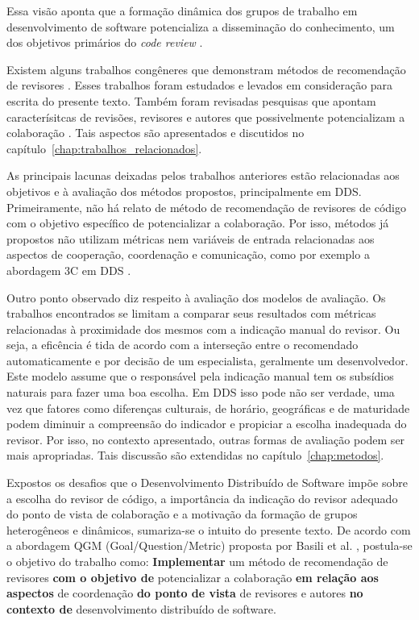 \documentclass[12pt,openany,oneside,a4paper,english,brazil]{abntbibufjf}
\begin{document}
  Essa visão aponta que a formação  dinâmica dos grupos de trabalho em desenvolvimento de software potencializa a disseminação do conhecimento, um dos objetivos primários do \textit{code review} \cite{Bacchelli2013}.

  Existem alguns trabalhos congêneres que demonstram métodos de recomendação de revisores \cite{yu2014,Xia2015261,jiang2017}. Esses trabalhos foram estudados e levados em consideração para escrita do presente texto. Também foram revisadas pesquisas que apontam caracterísitcas de revisões, revisores e autores que possivelmente potencializam a colaboração \cite{Kemerer2009,Bird2015191,Baysal2013122}. Tais aspectos são apresentados e discutidos no capítulo~\ref{chap:trabalhos_relacionados}.

  As principais lacunas deixadas pelos trabalhos anteriores estão relacionadas aos objetivos e à avaliação dos métodos propostos, principalmente em DDS. Primeiramente, não há relato de método de recomendação de revisores de código com o objetivo específico de potencializar a colaboração. Por isso, métodos já propostos não utilizam métricas nem variáveis de entrada relacionadas aos aspectos de cooperação, coordenação e comunicação, como por exemplo a abordagem 3C em DDS \cite{fuks2003}.

  Outro ponto observado diz respeito à avaliação dos modelos de avaliação. Os trabalhos encontrados se limitam a comparar seus resultados com métricas relacionadas à proximidade dos mesmos com a indicação manual do revisor. Ou seja, a eficência é tida de acordo com a interseção entre o recomendado automaticamente e por decisão de um especialista, geralmente um desenvolvedor. Este modelo assume que o responsável pela indicação manual tem os subsídios naturais para fazer uma boa escolha. Em DDS isso pode não ser verdade, uma vez que fatores como diferenças culturais, de horário, geográficas e de maturidade podem diminuir a compreensão do indicador e propiciar a escolha inadequada do revisor. Por isso, no contexto apresentado, outras formas de avaliação podem ser mais apropriadas. Tais discussão são extendidas no capítulo~\ref{chap:metodos}.

  Expostos os desafios que o Desenvolvimento Distribuído de Software impõe sobre a escolha do revisor de código, a importância da indicação do revisor adequado do ponto de vista de colaboração e a motivação da formação de grupos heterogêneos e dinâmicos, sumariza-se o intuito do presente texto. De acordo com a abordagem QGM (Goal/Question/Metric) proposta por Basili et al. \cite{Basili1984}, postula-se o objetivo do trabalho como:  \textbf{Implementar} um método de recomendação de revisores \textbf{com o objetivo de} potencializar a colaboração \textbf{em relação aos aspectos} de coordenação \textbf{do ponto de vista} de revisores e autores \textbf{no contexto de} desenvolvimento distribuído de software.
\end{document}
